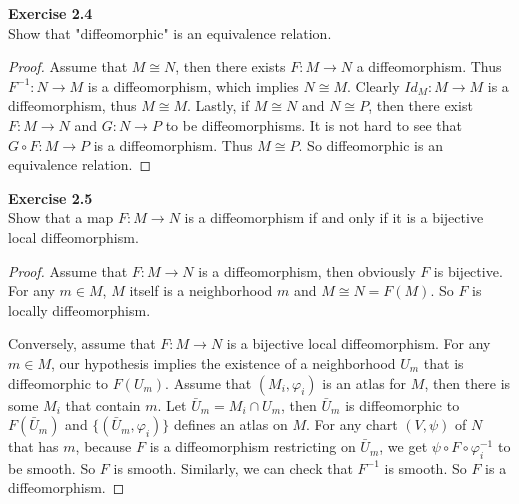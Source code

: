 \documentclass[12pt, a4paper]{article}
\theoremstyle{plain}
\def\phi{\varphi}
\newenvironment{exercise}[2][Exercise]
    { \begin{mdframed}[backgroundcolor=gray!20] \textbf{#1 #2} \\}
    {  \end{mdframed}}
\begin{document}
\begin{exercise}{2.4}
    Show that "diffeomorphic" is an equivalence relation.
\end{exercise}
    \begin{proof}
        Assume that $M\cong N$, then there exists $F\colon M\to N$ a diffeomorphism. Thus $F^{-1}\colon N\to M$ is a diffeomorphism, which implies $N\cong M$. Clearly $Id_M\colon M\to M$ is a diffeomorphism, thus $M\cong M$. Lastly, if $M\cong N$ and $N\cong P$, then there exist $F\colon M\to N$ and $G\colon N\to P$ to be diffeomorphisms. It is not hard to see that $G\circ F\colon M\to P$ is a diffeomorphism. Thus $M\cong P$. So diffeomorphic is an equivalence relation.
    \end{proof}


\begin{exercise}{2.5}
    Show that a map $F\colon M\to N$ is a diffeomorphism if and only if it is a bijective local diffeomorphism.
\end{exercise}
    \begin{proof}
        Assume that $F\colon M\to N$ is a diffeomorphism, then obviously $F$ is bijective. For any $m\in M$, $M$ itself is a neighborhood $m$ and $M\cong N = F(M)$. So $F$ is locally diffeomorphism. 

        Conversely, assume that $F\colon M\to N$ is a bijective local diffeomorphism. For any $m\in M$, our hypothesis implies the existence of a neighborhood $U_m$ that is diffeomorphic to $F(U_m)$. Assume that $(M_i,\phi_i)$ is an atlas for $M$, then there is some $M_i$ that contain $m$. Let $\bar U_m=M_i\cap U_m$, then $\bar U_m$ is diffeomorphic to $F(\bar U_m)$ and $\{(\bar U_m,\phi_i)\}$ defines an atlas on $M$. For any chart $(V,\psi)$ of $N$ that has $m$, because $F$ is a diffeomorphism restricting on $\bar U_m$, we get $\psi\circ F\circ\phi_i^{-1}$ to be smooth. So $F$ is smooth. Similarly, we can check that $F^{-1}$ is smooth. So $F$ is a diffeomorphism.
    \end{proof}
\end{document}
